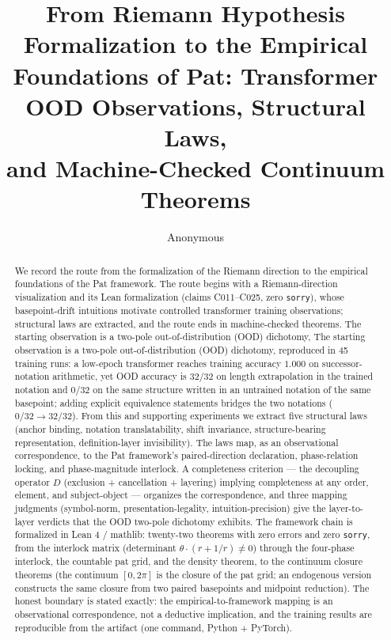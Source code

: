 \documentclass[sigplan,10pt,anonymous,review]{acmart}
\begin{document}
\title{From Riemann Hypothesis Formalization to the Empirical\\
Foundations of Pat: Transformer OOD Observations, Structural Laws,\\
and Machine-Checked Continuum Theorems}

\author{Anonymous}

\begin{abstract}
We record the route from the formalization of the Riemann direction
to the empirical foundations of the Pat framework. The route begins
with a Riemann-direction visualization and its Lean formalization
(claims C011--C025, zero \texttt{sorry}), whose basepoint-drift
intuitions motivate controlled transformer training observations;
structural laws are extracted, and the route ends in machine-checked
theorems. The starting observation is a two-pole
out-of-distribution (OOD) dichotomy, The starting
observation is a two-pole out-of-distribution (OOD) dichotomy, reproduced
in 45 training runs: a low-epoch transformer reaches training accuracy
$1.000$ on successor-notation arithmetic, yet OOD accuracy is $32/32$ on
length extrapolation in the trained notation and $0/32$ on the same
structure written in an untrained notation of the same basepoint; adding
explicit equivalence statements bridges the two notations ($0/32 \to
32/32$). From this and supporting experiments we extract five structural
laws (anchor binding, notation translatability, shift invariance,
structure-bearing representation, definition-layer invisibility). The
laws map, as an observational correspondence, to the Pat framework's
paired-direction declaration, phase-relation locking, and phase-magnitude
interlock. A completeness criterion --- the decoupling operator $D$
(exclusion + cancellation + layering) implying completeness at any
order, element, and subject-object --- organizes the correspondence, and
three mapping judgments (symbol-norm, presentation-legality,
intuition-precision) give the layer-to-layer verdicts that the OOD
two-pole dichotomy exhibits. The framework chain is formalized in Lean
4 / mathlib: twenty-two theorems with zero errors and zero
\texttt{sorry}, from the interlock matrix (determinant
$\theta \cdot (r + 1/r) \neq 0$) through the four-phase interlock, the
countable pat grid, and the density theorem, to the continuum closure
theorems (the continuum $[0, 2\pi]$ is the closure of the pat grid; an
endogenous version constructs the same closure from two paired
basepoints and midpoint reduction). The honest boundary is stated
exactly: the empirical-to-framework mapping is an observational
correspondence, not a deductive implication, and the training results
are reproducible from the artifact (one command, Python + PyTorch).
\end{abstract}
\end{document}
